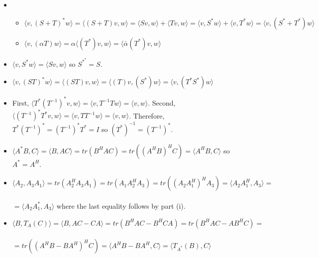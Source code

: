 \documentclass[12pt]{article}
\newenvironment{problem}[2][Problem]{\begin{trivlist}
\item[\hskip \labelsep {\bfseries #1}\hskip \labelsep {\bfseries #2}]}{\end{trivlist}}
\begin{document}
\begin{problem}{39.} \hfill
\begin{itemize}
\item [(i)]  \begin{itemize}
	\item [(1)]  $\langle v, (S+T)^* w \rangle  = \langle (S+T)v, w \rangle = \langle Sv, w \rangle + \langle Tv, w \rangle = \langle v,S^*w \rangle + \langle v,T^*w \rangle = \langle v, (S^* + T^*)w\rangle$
	\item [(2)] $\langle v, (\alpha T) w \rangle = \alpha\langle (T^*)v, w \rangle  = \langle \bar{ \alpha}(T^*)v, w \rangle $
\end{itemize} 
\item [(ii)] $\langle v, S^*w \rangle  =\langle Sv, w \rangle $  so $S^{*^*} = S$.
\item [(iii)]   $\langle v, (ST)^* w \rangle  = \langle (ST)v, w \rangle =\langle (T)v, (S^*) w \rangle = \langle v, (T^*S^*) w \rangle$
\item [(iv)] First, $\langle T^*(T^{-1})^*v, w \rangle = \langle v, T^{-1}Tw \rangle  = \langle v , w \rangle$. Second, $\langle (T^{-1})^*T^*v, w \rangle = \langle v, TT^{-1}w \rangle  = \langle v , w \rangle$. Therefore, $T^*(T^{-1})^* =(T^{-1})^*T^* =  I$ so $(T^*)^{-1} = (T^{-1})^*$. 
\end{itemize} 
\end{problem}

\begin{problem}{40.} \hfill
\begin{itemize}
\item [(i)] $ \langle A^*B,C \rangle  = \langle B,AC \rangle = tr(B^HAC) = tr((A^HB)^HC) = \langle A^HB,C \rangle$ so $A^* = A^H$. 
\item [(ii)] $\langle A_2, A_3A_1 \rangle = tr(A_2^HA_3A_1) = tr(A_1A_2^HA_3) = tr((A_2A_1^H)^HA_3) = \langle A_2 A_1^H, A_3\rangle =$ \\\\
$=  \langle A_2 A_1^*, A_3\rangle$ where the last equality follows by part (i).
\item [(iii)] $\langle B, T_A(C) \rangle = \langle B, AC -CA \rangle = tr(B^HAC -B^HCA) = tr(B^HAC - AB^HC) = $\\\\
$  = tr((A^HB - BA^H)^HC) = \langle A^HB - BA^H, C \rangle = \langle T_{A^*}(B), C \rangle $

\end{itemize} 
\end{problem}
\end{document}
